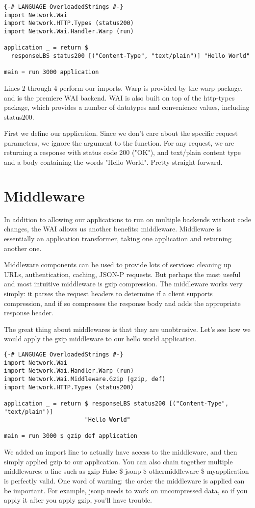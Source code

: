 \begin{lstlisting}
{-# LANGUAGE OverloadedStrings #-}
import Network.Wai
import Network.HTTP.Types (status200)
import Network.Wai.Handler.Warp (run)

application _ = return $
  responseLBS status200 [("Content-Type", "text/plain")] "Hello World"

main = run 3000 application
\end{lstlisting}%

Lines 2 through 4 perform our imports. Warp is provided by the warp package, and is 
the premiere WAI backend. WAI is also built on top of the http-types package, which 
provides a number of datatypes and convenience values, including status200.

First we define our application. Since we don't care about the specific request 
parameters, we ignore the argument to the function. For any request, we are 
returning a response with status code 200 ("OK"), and text/plain content type 
and a body containing the words "Hello World". Pretty straight-forward.

\section {Middleware}

In addition to allowing our applications to run on multiple backends without 
code changes, the WAI allows us another benefits: middleware. Middleware is essentially 
an application transformer, taking one application and returning another one.

Middleware components can be used to provide lots of services: cleaning up URLs,
authentication, caching, JSON-P requests. But
perhaps the most useful and most intuitive
middleware is gzip compression. The middleware
works very simply: it parses the request headers
to determine if a client supports compression, and
if so compresses the response body and adds the
appropriate response header.

The great thing about middlewares is that they are unobtrusive. Let's see how we would 
apply the gzip middleware to our hello world application.

\begin{lstlisting}
{-# LANGUAGE OverloadedStrings #-}
import Network.Wai
import Network.Wai.Handler.Warp (run)
import Network.Wai.Middleware.Gzip (gzip, def)
import Network.HTTP.Types (status200)

application _ = return $ responseLBS status200 [("Content-Type", "text/plain")]
                       "Hello World"

main = run 3000 $ gzip def application
\end{lstlisting}%

We added an import line to actually have access to the middleware, and then simply 
applied gzip to our application. You can also chain together multiple middlewares: 
a line such as gzip False \$ jsonp \$ othermiddleware \$ myapplication is perfectly valid. 
One word of warning: the order the middleware is applied can be important. For example, 
jsonp needs to work on uncompressed data, so if you apply it after you apply gzip, 
you'll have trouble.

